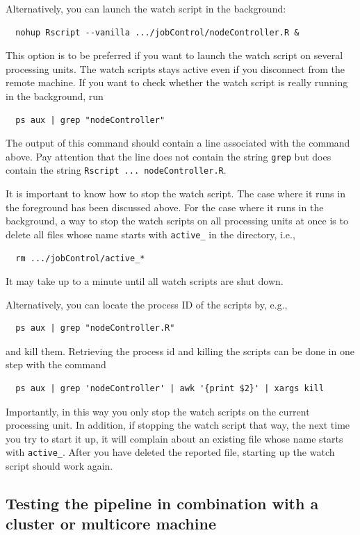 \documentclass[12pt,a4paper]{scrartcl}
\begin{document}
Alternatively, you can launch the watch script in the background:
\begin{verbatim}
  nohup Rscript --vanilla .../jobControl/nodeController.R &
\end{verbatim}
This option is to be preferred if you want to launch the watch script on several processing units.
The watch scripts stays active even if you disconnect from the remote machine.
If you want to check whether the watch script is really running in the background, run
\begin{verbatim}
  ps aux | grep "nodeController"
\end{verbatim}
The output of this command should contain a line associated with the command above.
Pay attention that the line does not contain the string \verb#grep# but does contain the string \verb#Rscript ... nodeController.R#.

It is important to know how to stop the watch script.
The case where it runs in the foreground has been discussed above.
For the case where it runs in the background, a way to stop the watch scripts on all processing units at once is to delete all files whose name starts with \verb|active_| in the  directory, i.e.,
\begin{verbatim}
  rm .../jobControl/active_*
\end{verbatim}
It may take up to a minute until all watch scripts are shut down.

Alternatively, you can locate the process ID of the scripts by, e.g., 
\begin{verbatim}
  ps aux | grep "nodeController.R"
\end{verbatim}
and kill them.
Retrieving the process id and killing the scripts can be done in one step with the command
\begin{verbatim}
  ps aux | grep 'nodeController' | awk '{print $2}' | xargs kill
\end{verbatim}
Importantly, in this way you only stop the watch scripts on the current processing unit.
In addition, if stopping the watch script that way, the next time you try to start it up, it will complain about an existing file whose name starts with \verb|active_|.
After you have deleted the reported file, starting up the watch script should work again.

 \subsection{Testing the pipeline in combination with a cluster or multicore machine}
 \label{subsec:test_pipeline_cluster}
\end{document}
